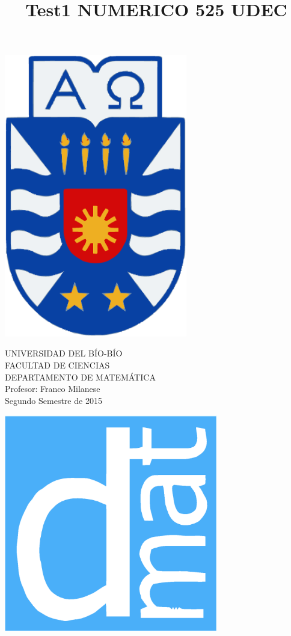 \documentclass[11pt]{article}
\begin{document}
\title{Test1  NUMERICO 525 UDEC}

{\begin{minipage}{2cm}
\hspace*{1cm}\includegraphics[width=0.6\textwidth]{escubo-ubb.eps}
\end{minipage}
\begin{minipage}{12cm}
\small
{\bf \rm 
{
\begin{center}
{\footnotesize UNIVERSIDAD DEL B\'IO-B\'IO} \\
{\scriptsize FACULTAD DE CIENCIAS}  \\
{\scriptsize DEPARTAMENTO DE MATEM\'ATICA}  \\
{\scriptsize Profesor:  Franco Milanese}\\
{\scriptsize Segundo Semestre de 2015}
\end{center}
}}
\end{minipage}}
{\begin{minipage}{2cm}
\hspace*{-0.5cm}\vspace*{-0.05cm}\includegraphics[width=0.7\textwidth]{escudo-dmat.eps}
\end{minipage}}
\end{document}
